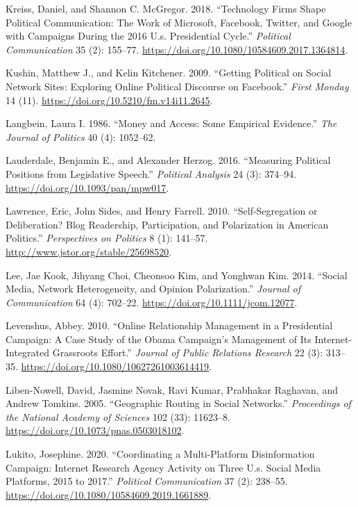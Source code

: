 \documentclass[12pt,]{article}
\begin{document}
\leavevmode\hypertarget{ref-kreiss2018}{}%
Kreiss, Daniel, and Shannon C. McGregor. 2018. ``Technology Firms Shape
Political Communication: The Work of Microsoft, Facebook, Twitter, and
Google with Campaigns During the 2016 U.s. Presidential Cycle.''
\emph{Political Communication} 35 (2): 155--77.
\url{https://doi.org/10.1080/10584609.2017.1364814}.

\leavevmode\hypertarget{ref-kushin2009}{}%
Kushin, Matthew J., and Kelin Kitchener. 2009. ``Getting Political on
Social Network Sites: Exploring Online Political Discourse on
Facebook.'' \emph{First Monday} 14 (11).
\url{https://doi.org/10.5210/fm.v14i11.2645}.

\leavevmode\hypertarget{ref-langbein1986}{}%
Langbein, Laura I. 1986. ``Money and Access: Some Empirical Evidence.''
\emph{The Journal of Politics} 40 (4): 1052--62.

\leavevmode\hypertarget{ref-lauderdale2016}{}%
Lauderdale, Benjamin E., and Alexander Herzog. 2016. ``Measuring
Political Positions from Legislative Speech.'' \emph{Political Analysis}
24 (3): 374--94. \url{https://doi.org/10.1093/pan/mpw017}.

\leavevmode\hypertarget{ref-lawrence2010}{}%
Lawrence, Eric, John Sides, and Henry Farrell. 2010. ``Self-Segregation
or Deliberation? Blog Readership, Participation, and Polarization in
American Politics.'' \emph{Perspectives on Politics} 8 (1): 141--57.
\url{http://www.jstor.org/stable/25698520}.

\leavevmode\hypertarget{ref-lee2014}{}%
Lee, Jae Kook, Jihyang Choi, Cheonsoo Kim, and Yonghwan Kim. 2014.
``Social Media, Network Heterogeneity, and Opinion Polarization.''
\emph{Journal of Communication} 64 (4): 702--22.
\url{https://doi.org/10.1111/jcom.12077}.

\leavevmode\hypertarget{ref-levenshus2010}{}%
Levenshus, Abbey. 2010. ``Online Relationship Management in a
Presidential Campaign: A Case Study of the Obama Campaign's Management
of Its Internet-Integrated Grassroots Effort.'' \emph{Journal of Public
Relations Research} 22 (3): 313--35.
\url{https://doi.org/10.1080/10627261003614419}.

\leavevmode\hypertarget{ref-liben2005}{}%
Liben-Nowell, David, Jasmine Novak, Ravi Kumar, Prabhakar Raghavan, and
Andrew Tomkins. 2005. ``Geographic Routing in Social Networks.''
\emph{Proceedings of the National Academy of Sciences} 102 (33):
11623--8. \url{https://doi.org/10.1073/pnas.0503018102}.

\leavevmode\hypertarget{ref-lukito2020}{}%
Lukito, Josephine. 2020. ``Coordinating a Multi-Platform Disinformation
Campaign: Internet Research Agency Activity on Three U.s. Social Media
Platforms, 2015 to 2017.'' \emph{Political Communication} 37 (2):
238--55. \url{https://doi.org/10.1080/10584609.2019.1661889}.
\end{document}
